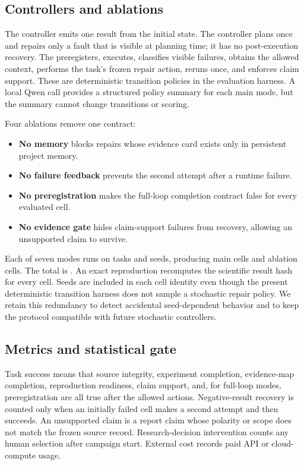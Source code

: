 \subsection{Controllers and ablations}

The \oneshot{} controller emits one result from the initial state. The
\executeonce{} controller plans once and repairs only a fault that is visible
at planning time; it has no post-execution recovery. The \systemloop{}
preregisters, executes, classifies visible failures, obtains the allowed
\vault{} context, performs the task's frozen repair action, reruns once, and
enforces claim support. These are deterministic transition policies in the
evaluation harness. A local Qwen call provides a structured policy summary
for each main mode, but the summary cannot change transitions or scoring.

Four ablations remove one contract:

\begin{itemize}
  \item \textbf{No \vault{} memory} blocks repairs whose evidence card exists
  only in persistent project memory.
  \item \textbf{No failure feedback} prevents the second attempt after a
  runtime failure.
  \item \textbf{No preregistration} makes the full-loop completion contract
  false for every evaluated cell.
  \item \textbf{No evidence gate} hides claim-support failures from recovery,
  allowing an unsupported claim to survive.
\end{itemize}

Each of seven modes runs on \TaskCount{} tasks and \SeedCount{} seeds,
producing \MainCellCount{} main cells and \AblationCellCount{} ablation cells.
The total is \CellCount{}. An exact reproduction recomputes the scientific
result hash for every cell. Seeds are included in each cell identity even
though the present deterministic transition harness does not sample a
stochastic repair policy. We retain this redundancy to detect accidental
seed-dependent behavior and to keep the protocol compatible with future
stochastic controllers.

\subsection{Metrics and statistical gate}

Task success means that source integrity, experiment completion, evidence-map
completion, reproduction readiness, claim support, and, for full-loop modes,
preregistration are all true after the allowed actions. Negative-result
recovery is counted only when an initially failed cell makes a second attempt
and then succeeds. An unsupported claim is a report claim whose polarity or
scope does not match the frozen source record. Research-decision intervention
counts any human selection after campaign start. External cost records paid
API or cloud-compute usage.

